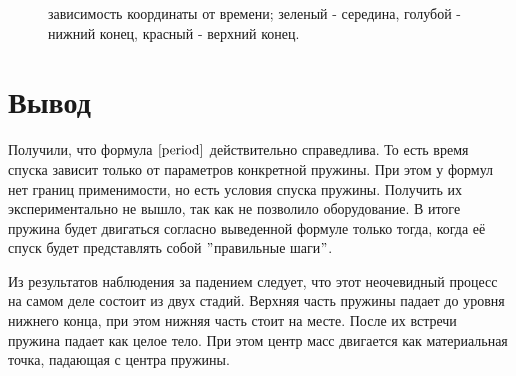\documentclass[a4paper,12pt]{report}
\begin{document}
\begin{figure} [H]
\caption{зависимость координаты от времени; зеленый - середина, голубой - нижний конец, красный - верхний конец.}
\end{figure}

\section*{Вывод} \text{ }

Получили, что формула $\ref{period}$ действительно справедлива. То есть время спуска зависит только от параметров конкретной пружины. При этом у формул нет границ применимости, но есть условия спуска пружины. Получить их экспериментально не вышло, так как не позволило оборудование. В итоге пружина будет двигаться согласно выведенной формуле только тогда, когда её спуск будет представлять собой $"$правильные шаги$"$.

Из результатов наблюдения за падением следует, что этот неочевидный процесс на самом деле состоит из двух стадий. Верхняя часть пружины падает до уровня нижнего конца, при этом нижняя часть стоит на месте. После их встречи пружина падает как целое тело. При этом центр масс двигается как материальная точка, падающая с центра пружины. 
\end{document}
